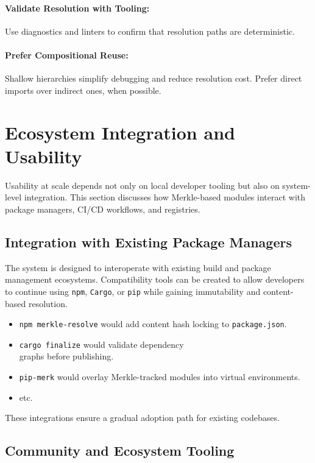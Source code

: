 \documentclass[sigplan,screen]{acmart}
\begin{document}
\paragraph{Validate Resolution with Tooling:} Use diagnostics and linters to confirm that resolution paths are deterministic.

\paragraph{Prefer Compositional Reuse:} Shallow hierarchies simplify debugging and reduce resolution cost. Prefer direct imports over indirect ones, when possible.

\section{Ecosystem Integration and Usability}
\label{sec:ecosystem}

Usability at scale depends not only on local developer tooling but also on system-level integration. This section discusses how Merkle-based modules interact with package managers, CI/CD workflows, and registries.

\subsection{Integration with Existing Package Managers}

The system is designed to interoperate with existing build and package management ecosystems. Compatibility tools can be created to allow developers to continue using \texttt{npm}, \texttt{Cargo}, or \texttt{pip} while gaining immutability and content-based resolution.

\begin{itemize}
	\item \texttt{npm merkle-resolve} would add content hash locking to \texttt{package.json}.
	\item \texttt{cargo finalize} would validate dependency \\graphs before publishing.
	\item \texttt{pip-merk} would overlay Merkle-tracked modules into virtual environments.
	\item etc.
\end{itemize}

These integrations ensure a gradual adoption path for existing codebases.

\subsection{Community and Ecosystem Tooling}
\end{document}
